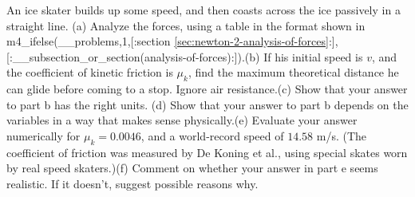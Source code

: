 An ice skater builds up some speed, and then coasts across the ice passively in
a straight line. (a) Analyze the forces, using
a table in the format shown in
m4_ifelse(__problems,1,[:section \ref{sec:newton-2-analysis-of-forces}:],[:__subsection_or_section(analysis-of-forces):]).\hwendpart (b) If his initial speed is $v$, and the
coefficient of kinetic friction is $\mu_k$, find the maximum theoretical distance he can glide before
coming to a stop. Ignore air resistance.\answercheck\hwendpart (c) Show that your answer to part b has the right units.\hwendpart
(d) Show that your answer to part b depends on the variables in a way that makes
sense physically.\hwendpart (e) Evaluate your answer numerically for $\mu_k=0.0046$, and a
world-record speed of $14.58$ m/s. (The coefficient of friction was measured by
De Koning et al., using special skates worn by real speed skaters.)\answercheck\hwendpart (f) Comment on whether
your answer in part e seems realistic. If it doesn't, suggest possible reasons why.\hwendpart
